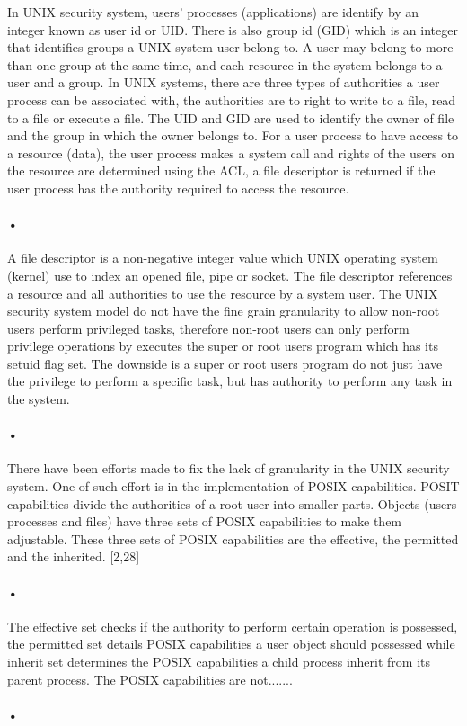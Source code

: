 \documentclass{article}
\begin{document}
In UNIX security system, users’ processes (applications) are identify by an integer known as user id or UID. There is also group id (GID) which is an integer that identifies groups a UNIX system user belong to. A user may belong to more than one group at the same time, and each resource in the system belongs to a user and a group. 
In UNIX systems, there are three types of authorities a user process can be associated with, the authorities are to right to write to a file, read to a file or execute a file. The UID and GID are used to identify the owner of file and the group in which the owner belongs to.
For a user process to have access to a resource (data), the user process makes a system call and rights of the users on the resource are determined using the ACL, a file descriptor is returned if the user process has the authority required to access the resource.\paragraph*{•}
A file descriptor is a non-negative integer value which UNIX operating system (kernel) use to index an opened file, pipe or socket. The file descriptor references a resource and all authorities to use the resource by a system user. The UNIX security system model do not have the fine grain granularity to allow non-root users perform privileged tasks, therefore non-root users can only perform privilege operations by executes the super or root user\textsc{}s program which has its set\textunderscore uid flag set. The downside is a super or root user\textsc{}s program do not just have the privilege to perform a specific task, but has authority to perform any task in the system.
\paragraph*{•}
There have been efforts made to fix the lack of granularity in the UNIX security system.  One of such effort is in the implementation of POSIX capabilities. POSIT capabilities divide the authorities of a root user into smaller parts.  Objects (users\textsc{}  processes and files) have three sets of POSIX capabilities to make them adjustable. These three sets of POSIX capabilities are the effective, the permitted and the inherited.  [2,28]
\paragraph*{•}


The effective set checks if the authority to perform certain operation is possessed, the permitted set details POSIX capabilities a user object should possessed while inherit set determines the POSIX capabilities a child process inherit from its parent process. The POSIX capabilities are not.......\paragraph*{•}
\end{document}
